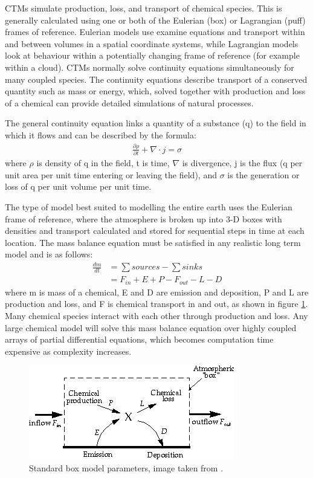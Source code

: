     CTMs simulate production, loss, and transport of chemical species.
    This is generally calculated using one or both of the Eulerian (box) or Lagrangian (puff) frames of reference.
    Eulerian models use examine equations and transport within and between volumes in a spatial coordinate systems, while Lagrangian models look at behaviour within a potentially changing frame of reference (for example within a cloud).
    CTMs normally solve continuity equations simultaneously for many coupled species.
    The continuity equations describe transport of a conserved quantity such as mass or energy, which, solved together with production and loss of a chemical can provide detailed simulations of natural processes.
    
    The general continuity equation links a quantity of a substance (q) to the field in which it flows and can be described by the formula:
    \begin{align*}
      \frac{\partial \rho}{\partial t} + \nabla \cdot j = \sigma 
    \end{align*}
    where $\rho$ is density of q in the field, t is time, $\nabla$ is divergence, j is the flux (q per unit area per unit time entering or leaving the field), and $\sigma$ is the generation or loss of q per unit volume per unit time.
    
    
    The type of model best suited to modelling the entire earth uses the Eulerian frame of reference, where the atmosphere is broken up into 3-D boxes with densities and transport calculated and stored for sequential steps in time at each location.
    The mass balance equation must be satisfied in any realistic long term model and is as follows: 
    \begin{align*}
      \frac{dm}{dt} & = \sum{sources}-\sum{sinks} \\
                    & = F_{in} + E + P - F_{out} - L - D 
    \end{align*}
    where m is mass of a chemical, E and D are emission and deposition, P and L are production and loss, and F is chemical transport in and out, as shown in figure \ref{LR:Models:fig_boxmodel}.
    Many chemical species interact with each other through production and loss. 
    Any large chemical model will solve this mass balance equation over highly coupled arrays of partial differential equations, which becomes computation time expensive as complexity increases.
    
    \begin{figure}
      \includegraphics{Figures/boxmodel.png}
      \caption{ %
        Standard box model parameters, image taken from \textcite{Jacob_1999_book}. }
      \label{LR:Models:fig_boxmodel}
    \end{figure}
    
